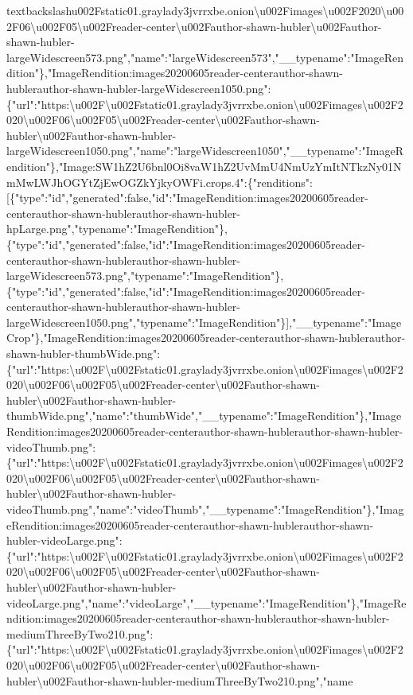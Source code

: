 textbackslash{}u002Fstatic01.graylady3jvrrxbe.onion\textbackslash{}u002Fimages\textbackslash{}u002F2020\textbackslash{}u002F06\textbackslash{}u002F05\textbackslash{}u002Freader-center\textbackslash{}u002Fauthor-shawn-hubler\textbackslash{}u002Fauthor-shawn-hubler-largeWidescreen573.png","name":"largeWidescreen573","\_\_typename":"ImageRendition"\},"ImageRendition:images20200605reader-centerauthor-shawn-hublerauthor-shawn-hubler-largeWidescreen1050.png":\{"url":"https:\textbackslash{}u002F\textbackslash{}u002Fstatic01.graylady3jvrrxbe.onion\textbackslash{}u002Fimages\textbackslash{}u002F2020\textbackslash{}u002F06\textbackslash{}u002F05\textbackslash{}u002Freader-center\textbackslash{}u002Fauthor-shawn-hubler\textbackslash{}u002Fauthor-shawn-hubler-largeWidescreen1050.png","name":"largeWidescreen1050","\_\_typename":"ImageRendition"\},"Image:SW1hZ2U6bnl0Oi8vaW1hZ2UvMmU4NmUzYmItNTkzNy01NmMwLWJhOGYtZjEwOGZkYjkyOWFi.crops.4":\{"renditions":{[}\{"type":"id","generated":false,"id":"ImageRendition:images20200605reader-centerauthor-shawn-hublerauthor-shawn-hubler-hpLarge.png","typename":"ImageRendition"\},\{"type":"id","generated":false,"id":"ImageRendition:images20200605reader-centerauthor-shawn-hublerauthor-shawn-hubler-largeWidescreen573.png","typename":"ImageRendition"\},\{"type":"id","generated":false,"id":"ImageRendition:images20200605reader-centerauthor-shawn-hublerauthor-shawn-hubler-largeWidescreen1050.png","typename":"ImageRendition"\}{]},"\_\_typename":"ImageCrop"\},"ImageRendition:images20200605reader-centerauthor-shawn-hublerauthor-shawn-hubler-thumbWide.png":\{"url":"https:\textbackslash{}u002F\textbackslash{}u002Fstatic01.graylady3jvrrxbe.onion\textbackslash{}u002Fimages\textbackslash{}u002F2020\textbackslash{}u002F06\textbackslash{}u002F05\textbackslash{}u002Freader-center\textbackslash{}u002Fauthor-shawn-hubler\textbackslash{}u002Fauthor-shawn-hubler-thumbWide.png","name":"thumbWide","\_\_typename":"ImageRendition"\},"ImageRendition:images20200605reader-centerauthor-shawn-hublerauthor-shawn-hubler-videoThumb.png":\{"url":"https:\textbackslash{}u002F\textbackslash{}u002Fstatic01.graylady3jvrrxbe.onion\textbackslash{}u002Fimages\textbackslash{}u002F2020\textbackslash{}u002F06\textbackslash{}u002F05\textbackslash{}u002Freader-center\textbackslash{}u002Fauthor-shawn-hubler\textbackslash{}u002Fauthor-shawn-hubler-videoThumb.png","name":"videoThumb","\_\_typename":"ImageRendition"\},"ImageRendition:images20200605reader-centerauthor-shawn-hublerauthor-shawn-hubler-videoLarge.png":\{"url":"https:\textbackslash{}u002F\textbackslash{}u002Fstatic01.graylady3jvrrxbe.onion\textbackslash{}u002Fimages\textbackslash{}u002F2020\textbackslash{}u002F06\textbackslash{}u002F05\textbackslash{}u002Freader-center\textbackslash{}u002Fauthor-shawn-hubler\textbackslash{}u002Fauthor-shawn-hubler-videoLarge.png","name":"videoLarge","\_\_typename":"ImageRendition"\},"ImageRendition:images20200605reader-centerauthor-shawn-hublerauthor-shawn-hubler-mediumThreeByTwo210.png":\{"url":"https:\textbackslash{}u002F\textbackslash{}u002Fstatic01.graylady3jvrrxbe.onion\textbackslash{}u002Fimages\textbackslash{}u002F2020\textbackslash{}u002F06\textbackslash{}u002F05\textbackslash{}u002Freader-center\textbackslash{}u002Fauthor-shawn-hubler\textbackslash{}u002Fauthor-shawn-hubler-mediumThreeByTwo210.png","name